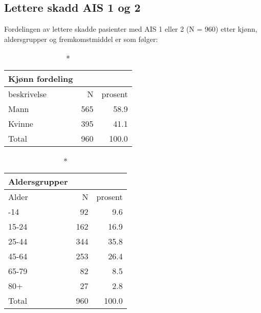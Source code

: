 \documentclass[
  letterpaper,
  DIV=11,
  numbers=noendperiod]{scrartcl}
\begin{document}
\subsection{Lettere skadd AIS 1 og 2}\label{lettere-skadd-ais-1-og-2}

Fordelingen av lettere skadde pasienter med AIS 1 eller 2 (N = 960)
etter kjønn, aldersgrupper og fremkomstmiddel er som følger:

\begingroup
\fontsize{12.0pt}{14.4pt}\selectfont
\begin{longtable*}{lrr}
\caption*{
{\large Kjønn fordeling}
} \\ 
\toprule
beskrivelse & N & prosent \\ 
\midrule\addlinespace[2.5pt]
Mann & 565 & 58.9 \\ 
Kvinne & 395 & 41.1 \\ 
Total & 960 & 100.0 \\ 
\bottomrule
\end{longtable*}
\endgroup

\begingroup
\fontsize{12.0pt}{14.4pt}\selectfont
\begin{longtable*}{lrr}
\caption*{
{\large Aldersgrupper}
} \\ 
\toprule
Alder & N & prosent \\ 
\midrule{}-14 & 92 & 9.6 \\ 
15-24 & 162 & 16.9 \\ 
25-44 & 344 & 35.8 \\ 
45-64 & 253 & 26.4 \\ 
65-79 & 82 & 8.5 \\ 
80+ & 27 & 2.8 \\ 
Total & 960 & 100.0 \\ 
\bottomrule
\end{longtable*}
\endgroup
\end{document}
